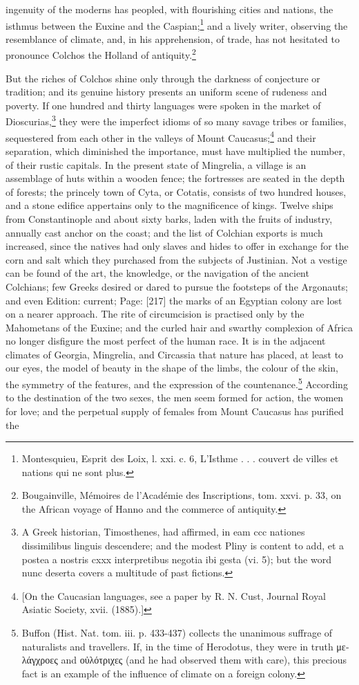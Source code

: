 ingenuity of the moderns has peopled, with flourishing cities and nations, the isthmus between the Euxine and the Caspian;\footnote{Montesquieu, Esprit des Loix, l. xxi. c. 6, L\texthebrew{}’Isthme . . . couvert de villes et nations qui ne sont plus.} and a lively writer, observing the resemblance of climate, and, in his apprehension, of trade, has not hesitated to pronounce Colchos the Holland of antiquity.\footnote{Bougainville, Mémoires de l\texthebrew{}’Académie des Inscriptions, tom. xxvi. p. 33, on the African voyage of Hanno and the commerce of antiquity.}

But the riches of Colchos shine only through the darkness of conjecture or tradition; and its genuine history presents an uniform scene of rudeness and poverty. If one hundred and thirty languages were spoken in the market of Dioscurias,\footnote{A Greek historian, Timosthenes, had affirmed, in eam ccc nationes dissimilibus linguis descendere; and the modest Pliny is content to add, et a postea a nostris cxxx interpretibus negotia ibi gesta (vi. 5); but the word nunc deserta covers a multitude of past fictions.} they were the imperfect idioms of so many savage tribes or families, sequestered from each other in the valleys of Mount Caucasus;\footnote{[On the Caucasian languages, see a paper by R. N. Cust, Journal Royal Asiatic Society, xvii. (1885).]} and their separation, which diminished the importance, must have multiplied the number, of their rustic capitals. In the present state of Mingrelia, a village is an assemblage of huts within a wooden fence; the fortresses are seated in the depth of forests; the princely town of Cyta, or Cotatis, consists of two hundred houses, and a stone edifice appertains only to the magnificence of kings. Twelve ships from Constantinople and about sixty barks, laden with the fruits of industry, annually cast anchor on the coast; and the list of Colchian exports is much increased, since the natives had only slaves and hides to offer in exchange for the corn and salt which they purchased from the subjects of Justinian. Not a vestige can be found of the art, the knowledge, or the navigation of the ancient Colchians; few Greeks desired or dared to pursue the footsteps of the Argonauts; and even Edition: current; Page: [217] the marks of an Egyptian colony are lost on a nearer approach. The rite of circumcision is practised only by the Mahometans of the Euxine; and the curled hair and swarthy complexion of Africa no longer disfigure the most perfect of the human race. It is in the adjacent climates of Georgia, Mingrelia, and Circassia that nature has placed, at least to our eyes, the model of beauty in the shape of the limbs, the colour of the skin, the symmetry of the features, and the expression of the countenance.\footnote{Buffon (Hist. Nat. tom. iii. p. 433-437) collects the unanimous suffrage of naturalists and travellers. If, in the time of Herodotus, they were in truth \textgreek{μελάγχροες} and \textgreek{ο\texthebrew{ὐ}λότριχες} (and he had observed them with care), this precious fact is an example of the influence of climate on a foreign colony.} According to the destination of the two sexes, the men seem formed for action, the women for love; and the perpetual supply of females from Mount Caucasus has purified the 